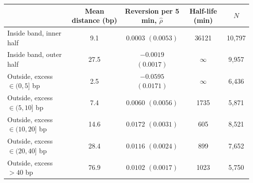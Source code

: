 \begin{tabular}{lcccc}
\toprule
 & Mean distance (bp) & Reversion per 5 min, $\hat\rho$ & Half-life (min) & $N$ \\
\midrule
Inside band, inner half & 9.1 & $0.0003$ $(0.0053)$ & 36121 & 10,797 \\
Inside band, outer half & 27.5 & $-0.0019$ $(0.0017)$ & $\infty$ & 9,957 \\
Outside, excess $\in(0,5]$ bp & 2.5 & $-0.0595$ $(0.0171)$ & $\infty$ & 6,436 \\
Outside, excess $\in(5,10]$ bp & 7.4 & $0.0060$ $(0.0056)$ & 1735 & 5,871 \\
Outside, excess $\in(10,20]$ bp & 14.6 & $0.0172$ $(0.0031)$ & 605 & 8,521 \\
Outside, excess $\in(20,40]$ bp & 28.4 & $0.0116$ $(0.0024)$ & 899 & 7,652 \\
Outside, excess $>40$ bp & 76.9 & $0.0102$ $(0.0017)$ & 1023 & 5,750 \\
\bottomrule
\end{tabular}
